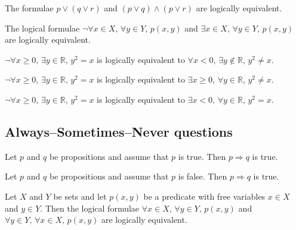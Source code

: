\begin{chapex} %
The formulae $p \vee (q \vee r)$ and $(p \vee q) \wedge (p \vee r)$ are logically equivalent.
\end{chapex}

\begin{chapex} %
The logical formulae $\neg \forall x \in X,\, \forall y \in Y,\, p(x,y)$ and $\exists x \in X,\, \forall y \in Y,\, p(x,y)$ are logically equivalent.
\end{chapex}

\begin{chapex} %
$\neg \forall x \ge 0,\, \exists y \in \mathbb{R},\, y^2=x$ is logically equivalent to $\forall x < 0,\, \exists y \not\in \mathbb{R},\, y^2 \ne x$.
\end{chapex}

\begin{chapex} %
$\neg \forall x \ge 0,\, \exists y \in \mathbb{R},\, y^2=x$ is logically equivalent to $\exists x \ge 0,\, \forall y \in \mathbb{R},\, y^2 \ne x$.
\end{chapex}

\begin{chapex} %
\label{cqLogicTFEnd}
$\neg \forall x \ge 0,\, \exists y \in \mathbb{R},\, y^2=x$ is logically equivalent to $\exists x < 0,\, \forall y \in \mathbb{R},\, y^2 = x$.
\end{chapex}

\subsection*{Always--Sometimes--Never questions}


\begin{chapex} %
\label{cqLogicASNBegin}
Let $p$ and $q$ be propositions and assume that $p$ is true. Then $p \Rightarrow q$ is true.
\end{chapex}

\begin{chapex} %
Let $p$ and $q$ be propositions and assume that $p$ is false. Then $p \Rightarrow q$ is true.
\end{chapex}

\begin{chapex} %
Let $X$ and $Y$ be sets and let $p(x,y)$ be a predicate with free variables $x \in X$ and $y \in Y$. Then the logical formulae $\forall x \in X,\, \forall y \in Y,\, p(x,y)$ and $\forall y \in Y,\, \forall x \in X,\, p(x,y)$ are logically equivalent.
\end{chapex}

